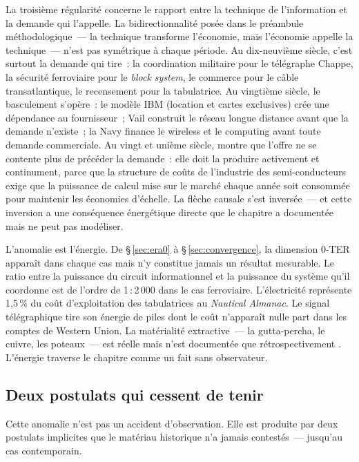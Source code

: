 La troisième régularité concerne le rapport entre la technique de l'information et la demande qui l'appelle. La bidirectionnalité posée dans le préambule méthodologique~--- la technique transforme l'économie, mais l'économie appelle la technique~--- n'est pas symétrique à chaque période. Au dix-neuvième siècle, c'est surtout la demande qui tire~: la coordination militaire pour le télégraphe Chappe, la sécurité ferroviaire pour le \emph{block system}, le commerce pour le câble transatlantique, le recensement pour la tabulatrice. Au vingtième siècle, le basculement s'opère~: le modèle IBM (location et cartes exclusives) crée une dépendance au fournisseur~; Vail construit le réseau longue distance avant que la demande n'existe~; la Navy finance le wireless et le computing avant toute demande commerciale. Au vingt et unième siècle, \textcite{roussilhe_phase_2025} montre que l'offre ne se contente plus de précéder la demande~: elle doit la produire activement et continument, parce que la structure de coûts de l'industrie des semi-conducteurs exige que la puissance de calcul mise sur le marché chaque année soit \og consommée\fg{} pour maintenir les économies d'échelle. La flèche causale s'est inversée~--- et cette inversion a une conséquence énergétique directe que le chapitre a documentée mais ne peut pas modéliser.

L'anomalie est l'énergie. De §\,\ref{sec:era0} à §\,\ref{sec:convergence}, la dimension 0-TER apparaît dans chaque cas mais n'y constitue jamais un résultat mesurable. Le ratio entre la puissance du circuit informationnel et la puissance du système qu'il coordonne est de l'ordre de 1\,:\,2\,000 dans le cas ferroviaire. L'électricité représente 1,5\,\% du coût d'exploitation des tabulatrices au \emph{Nautical Almanac}. Le signal télégraphique tire son énergie de piles dont le coût n'apparaît nulle part dans les comptes de Western Union. La matérialité extractive~--- la gutta-percha, le cuivre, les poteaux~--- est réelle mais n'est documentée que rétrospectivement \parencite{tully_victorian_2009, fitzmaurice_material_2023}. L'énergie traverse le chapitre comme un fait sans observateur.


\subsection{Deux postulats qui cessent de tenir}\label{subsec:postulats}

Cette anomalie n'est pas un accident d'observation. Elle est produite par deux postulats implicites que le matériau historique n'a jamais contestés~--- jusqu'au cas contemporain.

